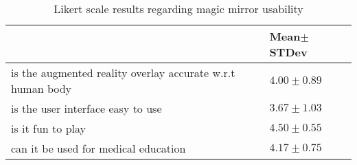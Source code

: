 \begin{table}
	\caption{Likert scale results regarding magic mirror usability}
	\label{tb:3-PRMM:results2}
	\scriptsize
	\begin{center}
		\begin{tabular}{p{8cm}|p{3cm}}
			\space & Mean$\pm$ STDev \\
			\hline
			is the augmented reality overlay accurate w.r.t human body & $4.00\pm0.89$\\
			is the user interface easy to use & $3.67\pm1.03$ \\
			is it fun to play & $4.50\pm0.55$\\
			can it be used for medical education & $4.17\pm0.75$
		\end{tabular}
	\end{center}
\end{table}